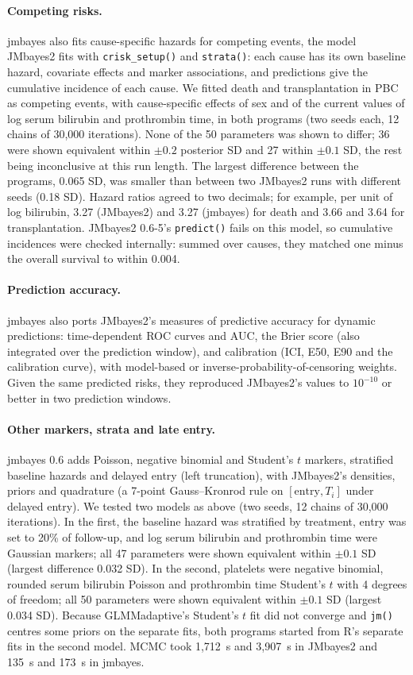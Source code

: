 \documentclass[11pt]{article}
\begin{document}
\paragraph{Competing risks.} jmbayes also fits cause-specific hazards for competing events,
the model JMbayes2 fits with \texttt{crisk\_setup()} and \texttt{strata()}: each cause has
its own baseline hazard, covariate effects and marker associations, and predictions give
the cumulative incidence of each cause. We fitted death and transplantation in PBC as
competing events, with cause-specific effects of sex and of the current values of log
serum bilirubin and prothrombin time, in both programs (two seeds each, 12 chains of
30,000 iterations). None of the 50 parameters was shown to differ; 36 were shown
equivalent within $\pm 0.2$ posterior SD and 27 within $\pm 0.1$ SD, the rest being
inconclusive at this run length. The largest difference between the programs, 0.065 SD,
was smaller than between two JMbayes2 runs with different seeds (0.18 SD). Hazard ratios
agreed to two decimals; for example, per unit of log bilirubin, 3.27 (JMbayes2) and 3.27
(jmbayes) for death and 3.66 and 3.64 for transplantation. JMbayes2 0.6-5's
\texttt{predict()} fails on this model, so cumulative incidences were checked internally:
summed over causes, they matched one minus the overall survival to within 0.004.

\paragraph{Prediction accuracy.} jmbayes also ports JMbayes2's measures of predictive
accuracy for dynamic predictions: time-dependent ROC curves and AUC, the Brier score
(also integrated over the prediction window), and calibration (ICI, E50, E90 and the
calibration curve), with model-based or inverse-probability-of-censoring weights. Given the
same predicted risks, they reproduced JMbayes2's values to $10^{-10}$ or better in two
prediction windows.

\paragraph{Other markers, strata and late entry.} jmbayes 0.6 adds Poisson, negative
binomial and Student's $t$ markers, stratified baseline hazards and delayed entry (left
truncation), with JMbayes2's densities, priors and quadrature (a 7-point Gauss--Kronrod
rule on $[\text{entry}, T_i]$ under delayed entry). We tested two models as above (two
seeds, 12 chains of 30,000 iterations). In the first, the baseline hazard was stratified by
treatment, entry was set to 20\% of follow-up, and log serum bilirubin and prothrombin
time were Gaussian markers; all 47 parameters were shown equivalent within $\pm 0.1$ SD
(largest difference 0.032 SD). In the second, platelets were negative binomial, rounded
serum bilirubin Poisson and prothrombin time Student's $t$ with 4 degrees of freedom; all
50 parameters were shown equivalent within $\pm 0.1$ SD (largest 0.034 SD). Because
GLMMadaptive's Student's $t$ fit did not converge and \texttt{jm()} centres some priors on
the separate fits, both programs started from R's separate fits in the second model. MCMC
took 1,712~s and 3,907~s in JMbayes2 and 135~s and 173~s in jmbayes.
\end{document}
